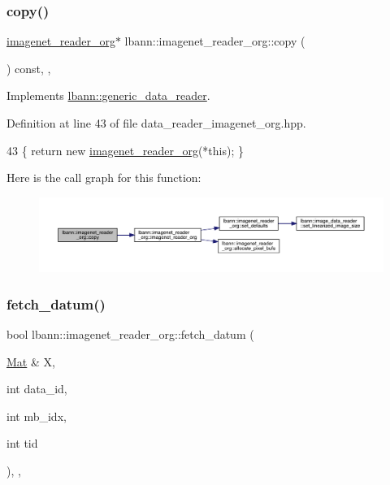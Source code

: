 \subsubsection{\texorpdfstring{copy()}{copy()}}
{\footnotesize\ttfamily \hyperlink{classlbann_1_1imagenet__reader__org}{imagenet\+\_\+reader\+\_\+org}$\ast$ lbann\+::imagenet\+\_\+reader\+\_\+org\+::copy (\begin{DoxyParamCaption}{ }\end{DoxyParamCaption}) const\hspace{0.3cm}{\ttfamily [inline]}, {\ttfamily [override]}, {\ttfamily [virtual]}}



Implements \hyperlink{classlbann_1_1generic__data__reader_a208ba1223e7aaa75e94b728501f12f86}{lbann\+::generic\+\_\+data\+\_\+reader}.



Definition at line 43 of file data\+\_\+reader\+\_\+imagenet\+\_\+org.\+hpp.


\begin{DoxyCode}
43 \{ \textcolor{keywordflow}{return} \textcolor{keyword}{new} \hyperlink{classlbann_1_1imagenet__reader__org_a77d88b53b26f903855da22e5d77ef06a}{imagenet\_reader\_org}(*\textcolor{keyword}{this}); \}
\end{DoxyCode}
Here is the call graph for this function\+:\nopagebreak
\begin{figure}[H]
\begin{center}
\leavevmode
\includegraphics[width=350pt]{classlbann_1_1imagenet__reader__org_ab13b41829be269110dfe74082918c349_cgraph}
\end{center}
\end{figure}
\mbox{\label{classlbann_1_1imagenet__reader__org_ad4c47413e16c1c53000b7d7be757ff6e}} 
\subsubsection{\texorpdfstring{fetch\+\_\+datum()}{fetch\_datum()}}
{\footnotesize\ttfamily bool lbann\+::imagenet\+\_\+reader\+\_\+org\+::fetch\+\_\+datum (\begin{DoxyParamCaption}\item[{\hyperlink{base_8hpp_a68f11fdc31b62516cb310831bbe54d73}{Mat} \&}]{X,  }\item[{int}]{data\+\_\+id,  }\item[{int}]{mb\+\_\+idx,  }\item[{int}]{tid }\end{DoxyParamCaption})\hspace{0.3cm}{\ttfamily [override]}, {\ttfamily [protected]}, {\ttfamily [virtual]}}

